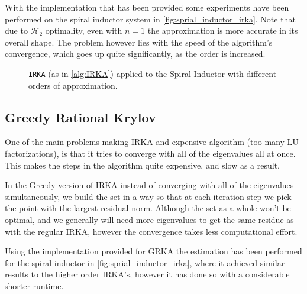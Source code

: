 \documentclass{article}
\newlength\figurewidth
\begin{document}
	With the implementation that has been provided some experiments have been performed on the spiral inductor system in \autoref{fig:sprial_inductor_irka}. Note that due to $\mathcal{H}_2$ optimality, even with $n=1$ the approximation is more accurate in its overall shape. The problem however lies with the speed of the algorithm's convergence, which goes up quite significantly, as the order is increased.
	
	\begin{figure}[h!]
		\centering
		\setlength{\figurewidth}{2\textwidth}
		
		\caption{\texttt{IRKA} (as in \autoref{alg:IRKA}) applied to the Spiral Inductor with different orders of approximation.}\label{fig:sprial_inductor_irka}
	\end{figure}

\subsection{Greedy Rational Krylov}
One of the main problems making IRKA and expensive algorithm (too many LU factorizations), is that it tries to converge with all of the eigenvalues all at once. This makes the steps in the algorithm quite expensive, and slow as a result. 

In the Greedy version of IRKA instead of converging with all of the eigenvalues simultaneously, we build the set in a way so that at each iteration step we pick the point with the largest residual norm. Although the set as a whole won't be optimal, and we generally will need more eigenvalues to get the same residue as with the regular IRKA, however the convergence takes less computational effort.

Using the implementation provided for GRKA the estimation has been performed for the spiral inductor in \autoref{fig:sprial_inductor_irka}, where it achieved similar results to the higher order IRKA's, however it has done so with a considerable shorter runtime.
\FloatBarrier
\pagebreak
\printbibliography
\end{document}
